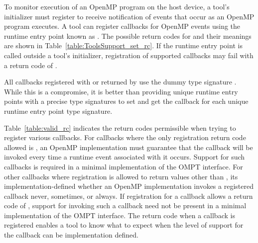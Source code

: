 To monitor execution of an OpenMP program on the host device, a tool's
initializer must register to receive notification
of events that occur as an OpenMP program executes.  
A tool can register callbacks for OpenMP events using
the runtime entry point known as 
.  The possible return codes for
 and their meanings are shown in
Table~\ref{table:ToolsSupport_set_rc}.  
If the  runtime entry point is
called outside a tool's initializer, registration of supported
callbacks may fail with a return code of . 

All callbacks registered with  or returned
by  use the dummy type signature
.  While this is a compromise, it is better
than providing unique runtime entry points with a precise type signatures to
set and get the callback for each unique runtime entry point type signature.

Table~\ref{table:valid_rc} indicates the return codes permissible
when trying to register various callbacks. For callbacks where the only registration return code
allowed is , an
OpenMP implementation must guarantee that the callback will be
invoked every time a runtime event associated with it occurs. Support
for such callbacks is required in a minimal implementation of the
OMPT interface. For other callbacks where registration is allowed to return values
other than , its implementation-defined
whether an OpenMP implementation invokes a registered callback
never, sometimes, or always. If registration for a callback allows 
a return code of , support for invoking such 
a callback need not be present in a minimal implementation of the 
OMPT interface.  The return code when a callback is
registered enables a tool to know what to expect when the level
of support for the callback can be implementation defined.



